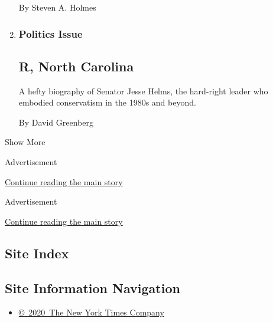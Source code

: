 \begin{enumerate}
  By Steven A. Holmes
\item
  \href{/2008/02/10/books/review/Greenberg-t.html}{}

  \hypertarget{politics-issue}{%
  \subsubsection{Politics Issue}\label{politics-issue}}

  \hypertarget{r-north-carolina}{%
  \subsection{R, North Carolina}\label{r-north-carolina}}

  A hefty biography of Senator Jesse Helms, the hard-right leader who
  embodied conservatism in the 1980s and beyond.

  By David Greenberg
\end{enumerate}

Show More

Advertisement

\protect\hyperlink{after-mid1}{Continue reading the main story}

Advertisement

\protect\hyperlink{after-mktg}{Continue reading the main story}

\hypertarget{site-index}{%
\subsection{Site Index}\label{site-index}}

\hypertarget{site-information-navigation}{%
\subsection{Site Information
Navigation}\label{site-information-navigation}}

\begin{itemize}
\tightlist
\item
  \href{https://help.nytimes.com/hc/en-us/articles/115014792127-Copyright-notice}{©~2020~The
  New York Times Company}
\end{itemize}

